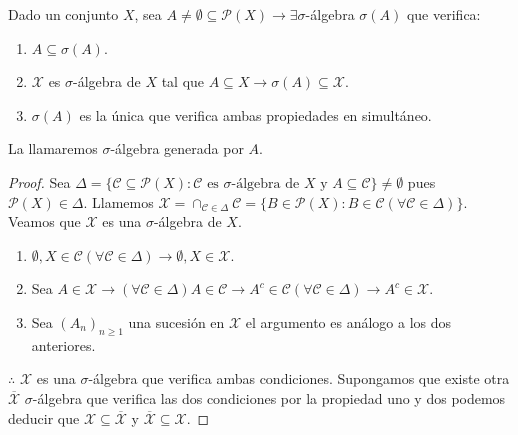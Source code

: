 \begin{prop}
    Dado un conjunto $X$, sea $A \neq \emptyset \subseteq \mathcal{P}(X) \to \exists \sigma$-álgebra $\sigma(A)$ que verifica: \begin{enumerate}
        \item $A \subseteq \sigma(A)$.
        \item $\mathcal{X}$ es $\sigma$-álgebra de $X$ tal que $A \subseteq X \to \sigma(A) \subseteq \mathcal{X}$.
        \item $\sigma(A)$ es la única que verifica ambas propiedades en simultáneo.
    \end{enumerate}
    La llamaremos $\sigma$-álgebra generada por $A$.

    \begin{proof}
        Sea $\Delta = \{ \mathscr{C} \subseteq \mathcal{P}(X) : \mathscr{C} \text{ es } \sigma \text{-álgebra de } X \text{ y } A \subseteq \mathscr{C} \} \neq \emptyset$ pues $\mathcal{P}(X) \in \Delta$.
        Llamemos $\mathcal{X} = \cap_{\mathscr{C} \in \Delta} \mathscr{C} = \{ B \in \mathcal{P}(X) : B \in \mathscr{C} (\forall \mathscr{C} \in \Delta) \}$.
        Veamos que $\mathcal{X}$ es una $\sigma$-álgebra de $X$.
        \begin{enumerate}
            \item $\emptyset, X \in \mathscr{C} (\forall \mathscr{C} \in \Delta) \to \emptyset, X \in \mathcal{X}$.
            \item Sea $A \in \mathcal{X} \to (\forall \mathscr{C} \in \Delta) A \in \mathscr{C} \to A^c \in \mathscr{C} (\forall \mathscr{C} \in \Delta) \to A^c \in \mathcal{X}$.
            \item Sea $(A_n)_{n \geq 1}$ una sucesión en $\mathcal{X}$ el argumento es análogo a los dos anteriores.
        \end{enumerate}
        $\therefore$ $\mathcal{X}$ es una $\sigma$-álgebra que verifica ambas condiciones.
        Supongamos que existe otra $\overline{\mathcal{X}}$ $\sigma$-álgebra que verifica las dos condiciones por la propiedad uno y dos podemos deducir que $\mathcal{X} \subseteq \overline{\mathcal{X}}$ y $\overline{\mathcal{X}} \subseteq \mathcal{X}$.
    \end{proof}
\end{prop}

